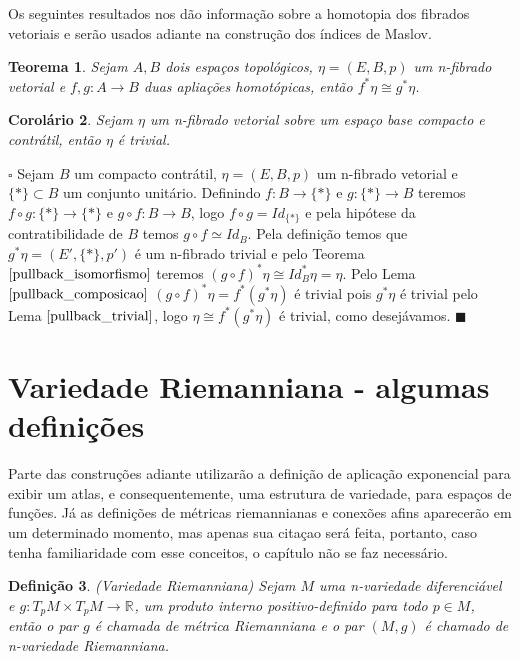 \documentclass[12pt]{book}
\newtheorem{teorema}{Teorema}[section]
\newtheorem{corolario}[teorema]{Corolário}
\newtheorem{definicao}[teorema]{Definição}
\newenvironment{prova}[1]{$\square$ #1}{\hfill$\blacksquare$}
\newcommand{\real}[1]{\mathbb{R}^{#1}}
\begin{document}
	Os seguintes resultados nos dão informação sobre a homotopia dos fibrados vetoriais e serão usados adiante na construção dos índices de Maslov.
	
	\begin{teorema}\label{pullback_isomorfismo}
		Sejam $A, B$ dois espaços topológicos, $\eta=(E, B, p)$ um n-fibrado vetorial e $f,g: A\to B$ duas apliações homotópicas, então $f^{*}\eta \cong g^{*}\eta$.
	\end{teorema}
	
	\begin{corolario}\label{pullback_contratil}
		Sejam $\eta$ um n-fibrado vetorial sobre um espaço base compacto e contrátil, então $\eta$ é trivial.
	\end{corolario}
	\begin{prova}
		Sejam $B$ um compacto contrátil, $\eta=(E, B, p)$ um n-fibrado vetorial e $\{*\} \subset B$ um conjunto unitário. Definindo $f:B\to \{*\}$ e $g:\{*\}\to B$ teremos $f\circ g : \{*\} \to \{*\}$ e $g\circ f:B\to B$, logo $f\circ g = Id_{\{*\}}$ e pela hipótese da contratibilidade de $B$ temos $g\circ f \simeq Id_{B}$. Pela definição temos que $g^{*}\eta = (E', \{*\}, p')$ é um n-fibrado trivial e pelo Teorema $\ref{pullback_isomorfismo}$ teremos $(g\circ f)^{*}\eta \cong Id_{B}^{*}\eta = \eta$. Pelo Lema $\ref{pullback_composicao}$ $(g\circ f)^{*}\eta = f^{*}(g^{*}\eta) $ é trivial pois $g^{*}\eta$ é trivial pelo Lema $\ref{pullback_trivial}$, logo $ \eta \cong f^{*}(g^{*}\eta)$ é trivial, como desejávamos.
	\end{prova}
	
	\section{Variedade Riemanniana - algumas definições}
	Parte das construções adiante utilizarão a definição de aplicação exponencial para exibir um atlas, e consequentemente, uma estrutura de variedade, para espaços de funções. Já as definições de métricas riemannianas e conexões afins aparecerão em um determinado momento, mas apenas sua citaçao será feita, portanto, caso tenha familiaridade com esse conceitos, o capítulo não se faz necessário.
	
	\begin{definicao}\label{definicao_variedade_riemanniana}
		(Variedade Riemanniana) Sejam $M$ uma n-variedade diferenciável e $g:T_{p}M \times T_{p}M \to \real{}$, um produto interno positivo-definido para todo $p \in M$, então o par $g$ é chamada de métrica Riemanniana e o par $(M, g)$ é chamado de n-variedade Riemanniana.
	\end{definicao}
	
\end{document}
